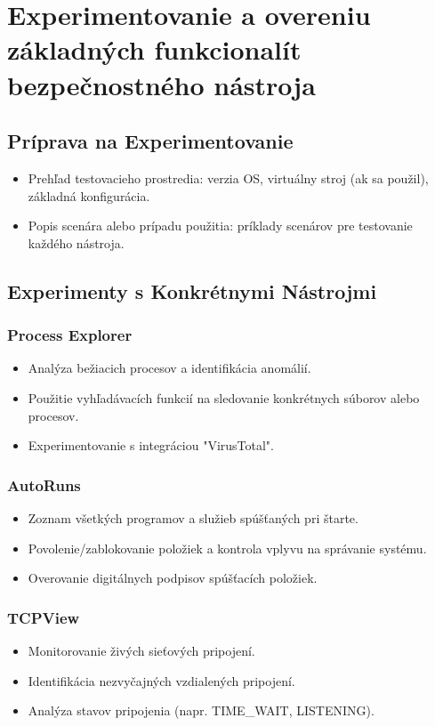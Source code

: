 \documentclass[conference]{IEEEtran}
\begin{document}
\section{Experimentovanie a overeniu základných funkcionalít bezpečnostného nástroja}
\subsection{Príprava na Experimentovanie}
\begin{itemize}
    \item Prehľad\cite{LinodeWindows} testovacieho prostredia: verzia OS, virtuálny stroj (ak sa použil), základná konfigurácia.
    \item Popis scenára alebo prípadu použitia: príklady scenárov pre testovanie každého nástroja.
\end{itemize}

\subsection{Experimenty s Konkrétnymi Nástrojmi}
\subsubsection{Process Explorer}
\begin{itemize}
    \item Analýza bežiacich procesov a identifikácia anomálií.
    \item Použitie vyhľadávacích funkcií na sledovanie konkrétnych súborov alebo procesov.
    \item Experimentovanie s integráciou "VirusTotal".
\end{itemize}

\subsubsection{AutoRuns}
\begin{itemize}
    \item Zoznam všetkých programov a služieb spúšťaných pri štarte.
    \item Povolenie/zablokovanie položiek a kontrola vplyvu na správanie systému.
    \item Overovanie digitálnych podpisov spúšťacích položiek.
\end{itemize}

\subsubsection{TCPView}
\begin{itemize}
    \item Monitorovanie živých sieťových pripojení.
    \item Identifikácia nezvyčajných vzdialených pripojení.
    \item Analýza stavov pripojenia (napr. TIME\_WAIT, LISTENING).
\end{itemize}
\end{document}
